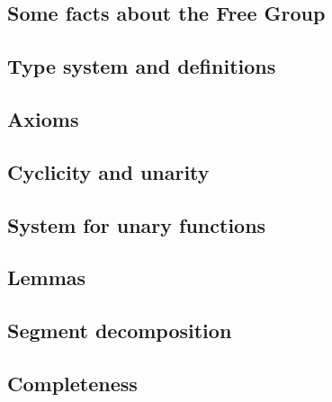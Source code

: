 \subsection{Some facts about the Free Group}


\subsection{Type system and definitions}


\subsection{Axioms}


\subsection{Cyclicity and unarity}


\subsection{System for unary functions}


\subsection{Lemmas}


\subsection{Segment decomposition}


\subsection{Completeness}

